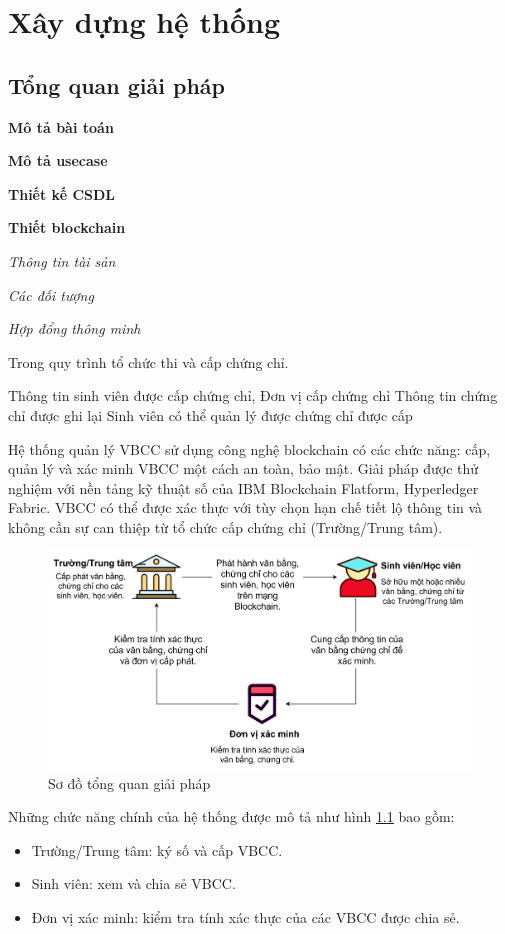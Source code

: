\chapter{Xây dựng hệ thống}
\section{Tổng quan giải pháp}

\textbf{Mô tả bài toán}

\textbf{Mô tả usecase}

\textbf{Thiết kế CSDL}

\textbf{Thiết blockchain}

\emph{Thông tin tài sản}

\emph{Các đối tượng}

\emph{Hợp đổng thông minh}


Trong quy trình tổ chức thi và cấp chứng chỉ.

Thông tin sinh viên được cấp chứng chỉ,
Đơn vị cấp chứng chỉ
Thông tin chứng chỉ được ghi lại
Sinh viên có thể quản lý được chứng chỉ được cấp

Hệ thống quản lý VBCC sử dụng công nghệ blockchain có các chức năng: cấp, quản lý và xác minh VBCC một cách an toàn, bảo mật. Giải pháp được thử nghiệm với nền tảng kỹ thuật số của IBM Blockchain Flatform, Hyperledger Fabric. VBCC có thể được xác thực với tùy chọn hạn chế tiết lộ thông tin và không cần sự can thiệp từ tổ chức cấp chứng chỉ (Trường/Trung tâm).

\begin{figure}[htbp]
\centering
\includegraphics[width=.9\linewidth]{img/vbcc.jpg}
\caption{Sơ đồ tổng quan giải pháp}
\label{fig:vbcc}

\end{figure}
Những chức năng chính của hệ thống được mô tả như hình \ref{fig:vbcc} bao gồm:
\begin{itemize}
\item Trường/Trung tâm: ký số và cấp VBCC.
\item Sinh viên: xem và chia sẻ VBCC.
\item Đơn vị xác minh: kiểm tra tính xác thực của các VBCC được chia sẻ.
\end{itemize}


